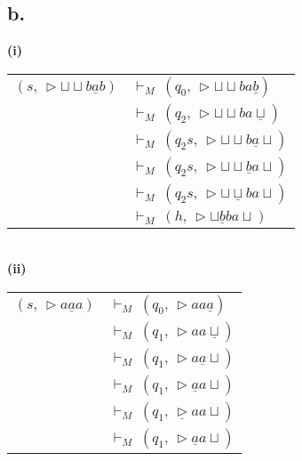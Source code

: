\documentclass[12pt]{article}
\begin{document}
\subsection*{b.}
  
  \textbf{(i)}
  \begin{minipage}{0.4\textwidth}
    \begin{table}[H]
      \begin{tabular}{ll}
        $(s,\,\triangleright\sqcup\sqcup b\underline{a}b)$ & $\vdash_M\ (q_0,\,\triangleright\sqcup\sqcup ba\underline{b})$       \\
                                                          & $\vdash_M\ (q_2,\,\triangleright\sqcup\sqcup ba\underline{\sqcup})$  \\
                                                          & $\vdash_M\ (q_2s,\,\triangleright\sqcup\sqcup b\underline{a}\sqcup)$ \\
                                                          & $\vdash_M\ (q_2s,\,\triangleright\sqcup\sqcup \underline{b}a\sqcup)$ \\
                                                          & $\vdash_M\ (q_2s,\,\triangleright\sqcup\underline{\sqcup} ba\sqcup)$ \\
                                                          & $\vdash_M\ (h,\,\triangleright\sqcup\underline{b}ba\sqcup)$         
      \end{tabular}
    \end{table}
  \end{minipage}\\
  \vspace{1cm}
  \hspace{-0.3cm}
  \textbf{(ii)}
  \begin{minipage}{0.4\textwidth}
    \begin{table}[H]
      \begin{tabular}{ll}
        $(s,\,\triangleright a\underline{a}a)$ & $\vdash_M\ (q_0,\,\triangleright aa\underline{a})$      \\
                                               & $\vdash_M\ (q_1,\,\triangleright aa\underline{\sqcup})$ \\
                                               & $\vdash_M\ (q_1,\,\triangleright a\underline{a}\sqcup)$ \\
                                               & $\vdash_M\ (q_1,\,\triangleright \underline{a}a\sqcup)$ \\
                                               & $\vdash_M\ (q_1,\,\underline{\triangleright} aa\sqcup)$ \\
                                               & $\vdash_M\ (q_1,\,\triangleright \underline{a}a\sqcup)$
      \end{tabular}
    \end{table}
  \end{minipage}
\end{document}
